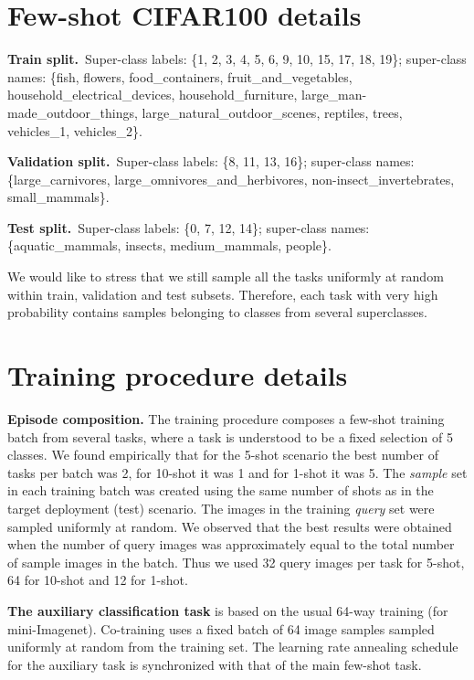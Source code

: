 \documentclass{article}
\begin{document}
\section{Few-shot CIFAR100 details} \label{sec:fc100_details}

\textbf{Train split.}~Super-class labels: \{1, 2, 3, 4, 5, 6, 9, 10, 15, 17, 18, 19\}; super-class names: \{fish, flowers, food\_containers, fruit\_and\_vegetables, household\_electrical\_devices, household\_furniture, large\_man-made\_outdoor\_things, large\_natural\_outdoor\_scenes, reptiles, trees, vehicles\_1, vehicles\_2\}. 

\textbf{Validation split.}~Super-class labels: \{8, 11, 13, 16\}; super-class names: \{large\_carnivores, large\_omnivores\_and\_herbivores, non-insect\_invertebrates, small\_mammals\}.

\textbf{Test split.}~Super-class labels: \{0, 7, 12, 14\}; super-class names: \{aquatic\_mammals, insects, medium\_mammals, people\}.

We would like to stress that we still sample all the tasks uniformly at random within train, validation and test subsets. Therefore, each task with very high probability contains samples belonging to classes from several superclasses.

\section{Training procedure details} \label{ssec:training_procedure_details}

\textbf{Episode composition.} The training procedure composes a few-shot training batch from several tasks, where a task is understood to be a fixed selection of 5 classes. We found empirically that for the 5-shot scenario the best number of tasks per batch was 2, for 10-shot it was 1 and for 1-shot it was 5. The \emph{sample} set in each training batch was created using the same number of shots as in the target deployment (test) scenario. The images in the training \emph{query} set were sampled uniformly at random. We observed that the best results were obtained when the number of query images was approximately equal to the total number of sample images in the batch. Thus we used 32 query images per task for 5-shot, 64 for 10-shot and 12 for 1-shot. 

\textbf{The auxiliary classification task} is based on the usual 64-way training (for mini-Imagenet). Co-training uses a fixed batch of 64 image samples sampled uniformly at random from the training set. The learning rate annealing schedule for the auxiliary task is synchronized with that of the main few-shot task.
\end{document}
